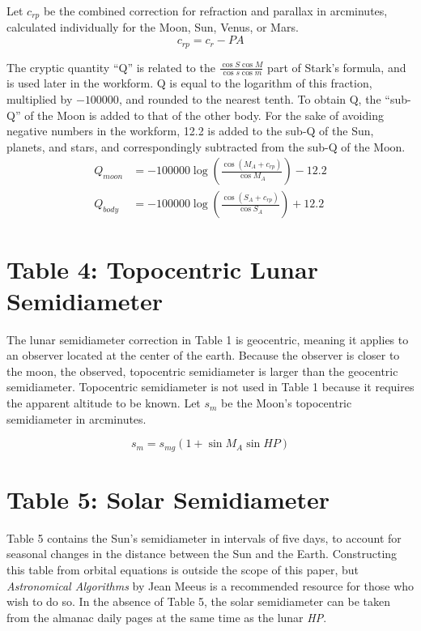 \documentclass[letterpaper]{article}
\numberwithin{equation}{section}
\begin{document}
	Let $c_{rp}$ be the combined correction for refraction and parallax in arcminutes, calculated individually for the Moon, Sun, Venus, or Mars.
	\begin{equation}
		c_{rp} = c_r - \mathit{PA}
	\end{equation}

	The cryptic quantity ``Q'' is related to the $\frac{\cos S \cos M}{\cos s \cos m}$ part of Stark's formula, and is used later in the workform. Q is equal to the logarithm of this fraction, multiplied by $-100000$, and rounded to the nearest tenth. To obtain Q, the ``sub-Q'' of the Moon is added to that of the other body. For the sake of avoiding negative numbers in the workform, 12.2 is added to the sub-Q of the Sun, planets, and stars, and correspondingly subtracted from the sub-Q of the Moon.
	\begin{align}
		Q_{moon} &= -100000 \log \left(\frac{\cos(M_{\!A}+c_{rp})}{\cos M_{\!A}}\right) - 12.2 \\
		Q_{body} &= -100000 \log \left(\frac{\cos(S_{\!A}+c_{rp})}{\cos S_{\!A}}\right) + 12.2
	\end{align}

\clearpage \section{Table 4: Topocentric Lunar Semidiameter}
	The lunar semidiameter correction in Table 1 is geocentric, meaning it applies to an observer located at the center of the earth. Because the observer is closer to the moon, the observed, topocentric semidiameter is larger than the geocentric semidiameter. Topocentric semidiameter is not used in Table 1 because it requires the apparent altitude to be known. Let $s_m$ be the Moon's topocentric semidiameter in arcminutes.

	\begin{equation}
		s_m = s_{mg} \left( 1 + \sin M_{\!A} \sin \mathit{HP} \right)
	\end{equation}

\section{Table 5: Solar Semidiameter}
	Table 5 contains the Sun's semidiameter in intervals of five days, to account for seasonal changes in the distance between the Sun and the Earth. Constructing this table from orbital equations is outside the scope of this paper, but \textit{Astronomical Algorithms} by Jean Meeus is a recommended resource for those who wish to do so. In the absence of Table 5, the solar semidiameter can be taken from the almanac daily pages at the same time as the lunar \textit{HP}.
\end{document}
